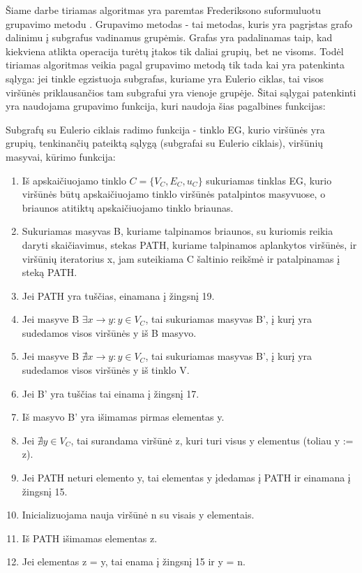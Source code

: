 Šiame darbe tiriamas algoritmas yra paremtas Frederiksono suformuluotu grupavimo metodu \cite{DSfUoMST}. Grupavimo metodas - tai metodas, kuris yra pagrįstas grafo dalinimu į subgrafus vadinamus grupėmis. Grafas yra padalinamas taip, kad kiekviena atlikta operacija turėtų įtakos tik daliai grupių, bet ne visoms. Todėl tiriamas algoritmas veikia pagal grupavimo metodą tik tada kai yra patenkinta sąlyga: jei tinkle egzistuoja subgrafas, kuriame yra Eulerio ciklas, tai visos viršūnės priklausančios tam subgrafui yra vienoje grupėje. Šitai sąlygai patenkinti yra naudojama grupavimo funkcija, kuri naudoja šias pagalbines funkcijas:

Subgrafų su Eulerio ciklais radimo funkcija - tinklo EG, kurio viršūnės yra grupių, tenkinančių pateiktą sąlygą (subgrafai su Eulerio ciklais), viršūnių masyvai, kūrimo funkcija:
\begin{enumerate}
	\item Iš apskaičiuojamo tinklo $C=\{V_C, E_C, u_C\}$ sukuriamas tinklas EG, kurio viršūnės būtų apskaičiuojamo tinklo viršūnės patalpintos masyvuose, o briaunos atitiktų apskaičiuojamo tinklo briaunas.
	\item Sukuriamas masyvas B, kuriame talpinamos briaunos, su kuriomis reikia daryti skaičiavimus, stekas PATH, kuriame talpinamos aplankytos viršūnės, ir viršūnių iteratorius x, jam suteikiama C šaltinio reikšmė ir patalpinamas į steką PATH.
	\item Jei PATH yra tuščias, einamana į žingsnį 19.
	\item Jei masyve B $\exists x \rightarrow y : y \in V_C$, tai sukuriamas masyvas B', į kurį yra sudedamos visos viršūnės y iš B masyvo.
	\item Jei masyve B $\nexists x \rightarrow y : y \in V_C$, tai sukuriamas masyvas B', į kurį yra sudedamos visos viršūnės y iš tinklo V.
	\item Jei B' yra tuščias tai einama į žingsnį 17.
	\item Iš masyvo B' yra išimamas pirmas elementas y.
	\item Jei $\nexists y \in V_C$, tai surandama viršūnė z, kuri turi visus y elementus (toliau y := z).
	\item Jei PATH neturi elemento y, tai elementas y įdedamas į PATH ir einamana į žingsnį 15.
	\item Inicializuojama nauja viršūnė n su visais y elementais.
	\item Iš PATH išimamas elementas z.
	\item Jei elementas z = y, tai enama į žingsnį 15 ir y = n.

\end{enumerate}
